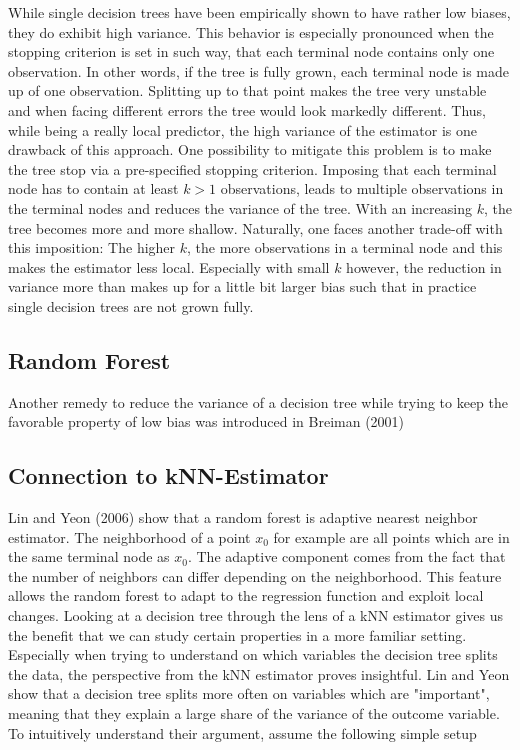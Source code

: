 {While single decision trees have been empirically shown to have rather low biases, they do exhibit high variance. This behavior is especially pronounced when the stopping criterion is set in such way, that each terminal node contains only one observation. In other words, if the tree is fully grown, each terminal node is made up of one observation. Splitting up to that point makes the tree very unstable and when facing different errors the tree would look markedly different. Thus, while being a really local predictor, the high variance of the estimator is one drawback of this approach. One possibility to mitigate this problem is to make the tree stop via a pre-specified stopping criterion. Imposing that each terminal node has to contain at least $k > 1$ observations, leads to multiple observations in the terminal nodes and reduces the variance of the tree. With an increasing $k$, the tree becomes more and more shallow. Naturally, one faces another trade-off with this imposition: The higher $k$, the more observations in a terminal node and this makes the estimator less local. Especially with small $k$ however, the reduction in variance more than makes up for a little bit larger bias such that in practice single decision trees are not grown fully.


\subsection{Random Forest}

Another remedy to reduce the variance of a decision tree while trying to keep the favorable property of low bias was introduced in Breiman (2001)

\subsection{Connection to kNN-Estimator}
Lin and Yeon (2006) show that a random forest is adaptive nearest neighbor estimator. 
The neighborhood of a point $x_0$ for example are all points which are in the same terminal node as $x_0$.
The adaptive component comes from the fact that the number of neighbors can differ depending on the neighborhood. This feature allows the random forest to adapt to the regression function and exploit local changes.
Looking at a decision tree through the lens of a kNN estimator gives us the benefit that we can study certain properties in a more familiar setting.
Especially when trying to understand on which variables the decision tree splits the data, the perspective from the kNN estimator proves insightful.
Lin and Yeon show that a decision tree splits more often on variables which are "important", meaning that they explain a large share of the variance of the outcome variable. 
To intuitively understand their argument, assume the following simple setup 

}
